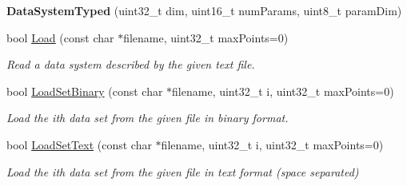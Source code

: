 \begin{DoxyCompactItemize}
\item 
\hypertarget{struct_d_r_d_s_p_1_1_data_system_typed_a0a2e1c728062460a99bd8439b1030122}{{\bfseries Data\-System\-Typed} (uint32\-\_\-t dim, uint16\-\_\-t num\-Params, uint8\-\_\-t param\-Dim)}\label{struct_d_r_d_s_p_1_1_data_system_typed_a0a2e1c728062460a99bd8439b1030122}

\item 
\hypertarget{struct_d_r_d_s_p_1_1_data_system_typed_a5ca9677e046e5e0217b5a85a1609ab12}{bool \hyperlink{struct_d_r_d_s_p_1_1_data_system_typed_a5ca9677e046e5e0217b5a85a1609ab12}{Load} (const char $\ast$filename, uint32\-\_\-t max\-Points=0)}\label{struct_d_r_d_s_p_1_1_data_system_typed_a5ca9677e046e5e0217b5a85a1609ab12}

\begin{DoxyCompactList}\small\item\em Read a data system described by the given text file. \end{DoxyCompactList}\item 
\hypertarget{struct_d_r_d_s_p_1_1_data_system_typed_af3009201b319094aaf57481c6554a45f}{bool \hyperlink{struct_d_r_d_s_p_1_1_data_system_typed_af3009201b319094aaf57481c6554a45f}{Load\-Set\-Binary} (const char $\ast$filename, uint32\-\_\-t i, uint32\-\_\-t max\-Points=0)}\label{struct_d_r_d_s_p_1_1_data_system_typed_af3009201b319094aaf57481c6554a45f}

\begin{DoxyCompactList}\small\item\em Load the ith data set from the given file in binary format. \end{DoxyCompactList}\item 
\hypertarget{struct_d_r_d_s_p_1_1_data_system_typed_a83d7c0da126fdd1edd9d569b3eee2ee0}{bool \hyperlink{struct_d_r_d_s_p_1_1_data_system_typed_a83d7c0da126fdd1edd9d569b3eee2ee0}{Load\-Set\-Text} (const char $\ast$filename, uint32\-\_\-t i, uint32\-\_\-t max\-Points=0)}\label{struct_d_r_d_s_p_1_1_data_system_typed_a83d7c0da126fdd1edd9d569b3eee2ee0}

\begin{DoxyCompactList}\small\item\em Load the ith data set from the given file in text format (space separated) \end{DoxyCompactList}\end{DoxyCompactItemize}
